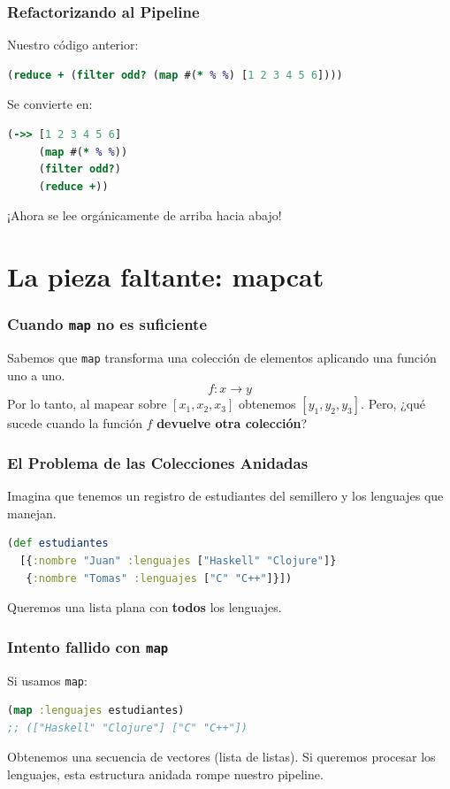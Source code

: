 \documentclass{beamer}
\begin{document}
\begin{frame}[fragile]
    \frametitle{Refactorizando al Pipeline}
    Nuestro código anterior:
    \begin{lstlisting}[language=Clojure]
(reduce + (filter odd? (map #(* % %) [1 2 3 4 5 6])))
    \end{lstlisting}
    
    Se convierte en:
    \begin{lstlisting}[language=Clojure]
(->> [1 2 3 4 5 6]
     (map #(* % %))
     (filter odd?)
     (reduce +))
    \end{lstlisting}
    ¡Ahora se lee orgánicamente de arriba hacia abajo!
\end{frame}

\section{La pieza faltante: mapcat}

\begin{frame}
    \frametitle{Cuando \texttt{map} no es suficiente}
    Sabemos que \texttt{map} transforma una colección de elementos aplicando una función uno a uno.
    $$
    f: x \rightarrow y 
    $$
    Por lo tanto, al mapear sobre $[x_1, x_2, x_3]$ obtenemos $[y_1, y_2, y_3]$.
    Pero, ¿qué sucede cuando la función $f$ \textbf{devuelve otra colección}?
\end{frame}

\begin{frame}[fragile]
    \frametitle{El Problema de las Colecciones Anidadas}
    Imagina que tenemos un registro de estudiantes del semillero y los lenguajes que manejan.
    \begin{lstlisting}[language=Clojure]
(def estudiantes 
  [{:nombre "Juan" :lenguajes ["Haskell" "Clojure"]}
   {:nombre "Tomas" :lenguajes ["C" "C++"]}])
    \end{lstlisting}
    Queremos una lista plana con \textbf{todos} los lenguajes.
\end{frame}

\begin{frame}[fragile]
    \frametitle{Intento fallido con \texttt{map}}
    Si usamos \texttt{map}:
    \begin{lstlisting}[language=Clojure]
(map :lenguajes estudiantes)
;; (["Haskell" "Clojure"] ["C" "C++"])
    \end{lstlisting}
    Obtenemos una secuencia de vectores (lista de listas). Si queremos procesar los lenguajes, esta estructura anidada rompe nuestro pipeline.
\end{frame}
\end{document}
